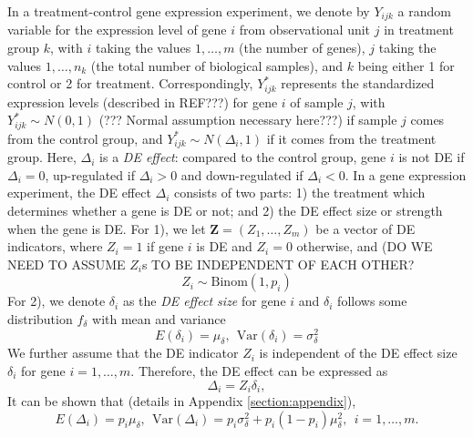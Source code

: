 \documentclass[11pt, a4paper]{article}
\begin{document}
	In a treatment-control gene expression experiment, we denote by $Y_{ijk}$ a random variable for the expression level of gene $i$ from observational unit $j$ in treatment group $k$, with $i$ taking the values $1, \ldots, m$ (the number of genes), $j$ taking the values $1, \ldots, n_k$ (the total number of biological samples), and $k$ being either 1 for control or 2 for treatment. Correspondingly, $Y^{\ast}_{ijk}$ represents the standardized expression levels (described in REF???) for gene $i$ of sample $j$, with $Y^{\ast}_{ijk}\sim N(0, 1)$ (??? Normal assumption necessary here???)  if sample $j$ comes from the control group, and $Y^{\ast}_{ijk}\sim N(\Delta_i, 1)$ if it comes from the treatment group. Here, $\Delta_i$ is a \textit{DE effect}: compared to the control group,  gene $i$ is not DE if $\Delta_i=0$, up-regulated if $\Delta_i >0 $ and down-regulated if $\Delta_i<0$.
	In a gene expression experiment, the DE effect $\Delta_i$ consists of two parts: 1) the treatment which determines whether a gene is DE or not; and 2) the DE effect size or strength when the gene is DE. 
	For 1), we let $\bm Z = (Z_1, \ldots, Z_m)$ be a vector of DE indicators, where $Z_i=1$ if gene $i$ is DE and $Z_i = 0$ otherwise, and (DO WE NEED TO ASSUME $Z_i$s TO BE INDEPENDENT OF EACH OTHER?
	\begin{equation}\label{eq:DEindicator}
		Z_i \sim \text{Binom}(1, p_i)
	\end{equation}
	For 2), we denote $\delta_i$ as the \textit{DE effect size} for gene $i$ and $\delta_i$ follows some distribution $ f_{\delta}$ with mean and variance
	\begin{equation}\label{eq:DEdistribution}
		E(\delta_i) = \mu_{\delta}, ~~\text{Var}(\delta_i) = \sigma^2_{\delta}
	\end{equation}
	We further assume that the DE indicator $Z_i$ is independent of the DE effect size $\delta_i$ for gene $i=1, \ldots, m$.  Therefore, the DE effect can be expressed as
	\begin{equation}\label{eq:DEeffect}
		\Delta_i = Z_i\delta_i,
	\end{equation}
	It can be shown that (details in Appendix \ref{section:appendix}), 
	\begin{equation}\label{eq:deltaMeanVar}
		E(\Delta_i) = p_i\mu_{\delta}, ~~  \text{Var}(\Delta_i)= p_i\sigma_{\delta}^2 + p_i(1-p_i)\mu_{\delta}^2, ~~i = 1, \ldots, m.
	\end{equation}
	
\end{document}
